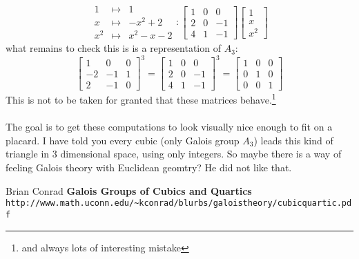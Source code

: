 \documentclass[12pt]{article}
\begin{document}
$$\begin{array}{ccccc}
1 & \mapsto & 1 \\
x & \mapsto & - x^2 + 2 \\
x^2 & \mapsto  & x^2 - x - 2 
\end{array}  :
\left[ 
\begin{array}{rrr} 1 &  0 & 0 \\
2 & 0 & -1 \\ 4 & 1 & -1\end{array}\right]
\left[ \begin{array}{l} 1 \\ x \\ x^2 \end{array}\right]$$
what remains to check this is is a representation of $A_3$:
$$ \left[ 
\begin{array}{rrr} 1 &  0 & 0 \\
-2 & -1 & 1 \\ 2 & -1 & 0\end{array}\right]^3 =  \left[ 
\begin{array}{rrr} 1 &  0 & 0 \\
2 & 0 & -1 \\ 4 & 1 & -1\end{array}\right]^3 = 
\left[ 
\begin{array}{rrr} 1 &  0 & 0 \\
0 & 1 & 0  \\ 0 & 0 & 1 \end{array}\right]$$ 
This is not to be taken for granted that these matrices behave.\footnote{and always lots of interesting mistake} \\\\
The goal is to get these computations to look visually nice enough to fit on a placard.  I have told you every cubic (only Galois group $A_3$) leads this kind of triangle in 3 dimensional space, using only integers.  So maybe there is a way of feeling Galois theory with Euclidean geomtry?  He did not like that.

\vfill

\begin{thebibliography}{}

\item Brian Conrad \textbf{Galois Groups of Cubics and Quartics} \\ \texttt{http://www.math.uconn.edu/\~{}kconrad/blurbs/galoistheory/cubicquartic.pdf}
 
\end{thebibliography} 
\end{document}
